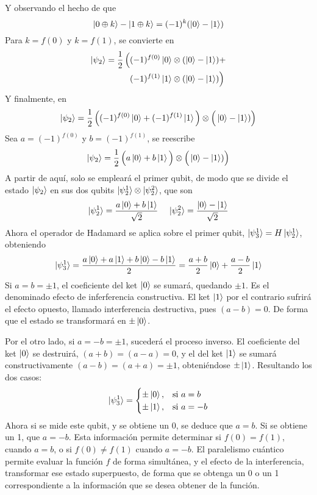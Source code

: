 Y observando el hecho de que
$$ \ket{0 \oplus k} - \ket{1 \oplus k} = (-1)^k (\ket 0 - \ket 1) $$
Para $k = f(0)$ y $k = f(1)$, se convierte en
\begin{equation*}
\begin{split}
\ket{\psi_{2}} = \frac{1}{2} \, \Big(
& (-1)^{f(0)} \ket{0} \otimes (\ket 0 - \ket 1) + \\
& (-1)^{f(1)} \ket{1} \otimes (\ket 0 - \ket 1) \Big)
\end{split}
\end{equation*}
Y finalmente, en
$$
\ket{\psi_{2}} = \frac{1}{2} \, \Big((-1)^{f(0)} \ket{0} + (-1)^{f(1)}\ket 1 \Big) 
\otimes \Big(\ket 0 - \ket 1) \Big)
$$
Sea $a = (-1)^{f(0)}$ y $b = (-1)^{f(1)}$, se reescribe
$$
\ket{\psi_{2}} = \frac{1}{2} \, \Big(a \ket{0} + b \ket 1 \Big) \otimes \Big(\ket 0 - 
\ket 1) \Big)
$$
A partir de aquí, solo se empleará el primer qubit, de modo que se divide el 
estado $\ket{\psi_{2}}$ en sus dos qubits $\ket{\psi_2^1} \otimes \ket{\psi_2^2}$, que 
son
$$
\ket{\psi_2^1} = \frac {a \ket{0} + b \ket 1}{\sqrt 2}\, \quad
\ket{\psi_2^2} = \frac {\ket 0 - \ket 1}{\sqrt 2}
$$
%
Ahora el operador de Hadamard se aplica sobre el primer qubit, $\ket{\psi_3^1} = 
H \ket{\psi_2^1}$, obteniendo
$$ \ket{\psi_3^1} = \frac{a \ket 0 + a \ket 1 + b \ket 0 - b \ket 1}{2}
= \frac{a+b}{2} \ket 0 + \frac{a-b}{2} \ket 1$$
%
Si $a = b = \pm 1$, el coeficiente del ket $\ket 0$ se sumará, quedando $\pm 1$.  
Es el denominado efecto de inferferencia constructiva. El ket $\ket 1$ por el 
contrario sufrirá el efecto opuesto, llamado interferencia destructiva, pues 
$(a-b) = 0$. De forma que el estado se transformará en $\pm \ket 0$.

Por el otro lado, si $a = -b = \pm 1$, sucederá el proceso inverso. El 
coeficiente del ket $\ket 0$ se destruirá, $(a+b) = (a-a) = 0$, y el del ket 
$\ket 1$ se sumará constructivamente $(a-b) = (a+a) = \pm 1$, obteniéndose $\pm
\ket 1$. Resultando los dos casos:
$$
\ket{\psi_3^1} = \begin{cases}
\pm \ket 0, & \text{si}\ a = b \\
\pm \ket 1, & \text{si}\ a = -b \\
\end{cases}
$$
Ahora si se mide este qubit, y se obtiene un 0, se deduce que $a = b$. Si se 
obtiene un 1, que $a=-b$. Esta información permite determinar si $f(0) = f(1)$, 
cuando $a = b$, o si $f(0) \neq f(1)$ cuando $a=-b$. El paralelismo cuántico 
permite evaluar la función $f$ de forma simultánea, y el efecto de la 
interferencia, transformar ese estado superpuesto, de forma que se obtenga un 0 
o un 1 correspondiente a la información que se desea obtener de la función.

